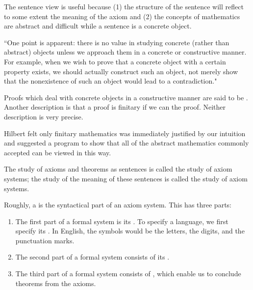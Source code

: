 The sentence view is useful because (1) the structure of the sentence will reflect to some extent the meaning of the axiom and (2) the concepts of mathematics are abstract and difficult while a sentence is a concrete object.

\begin{remark}
``One point is apparent: there is no value in studying concrete (rather than abstract) objects unless we approach them in a concrete or constructive manner.
For example, when we wish to prove that a concrete object with a certain property exists, we should actually construct such an object, not merely show that the nonexistence of such an object would lead to a contradiction."
\end{remark}

Proofs which deal with concrete objects in a constructive manner are said to be .
Another description is that a proof is finitary if we can  the proof. Neither description is very precise.

\begin{remark}
Hilbert felt only finitary mathematics was immediately justified by our intuition and suggested a program to show that all of the abstract mathematics commonly accepted can be viewed in this way.
\end{remark}

The study of axioms and theorems as sentences is called the  study of axiom systems; the study of the meaning of these sentences is called the  study of axiom  systems.

\begin{shaded*}
Roughly, a  is the syntactical part of an axiom system. This has three parts:
\begin{enumerate}
    \item The first part of a formal system is its .
        To specify a language, we first specify its .
        In English, the symbols would be the letters, the digits, and the punctuation marks.
    \item The second part of a formal system consists of its .
    \item The third part of a formal system consists of , which enable us to conclude theorems from the axioms.
\end{enumerate}
\end{shaded*}

